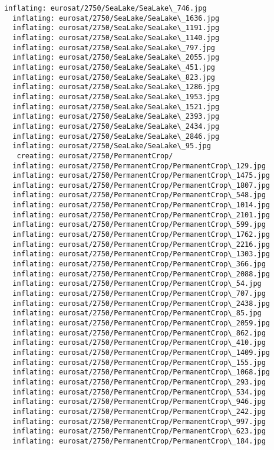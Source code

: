 \documentclass[11pt]{article}
\begin{document}
\begin{Verbatim}[commandchars=\\\{\}]
  inflating: eurosat/2750/SeaLake/SeaLake\_746.jpg
  inflating: eurosat/2750/SeaLake/SeaLake\_1636.jpg
  inflating: eurosat/2750/SeaLake/SeaLake\_1191.jpg
  inflating: eurosat/2750/SeaLake/SeaLake\_1140.jpg
  inflating: eurosat/2750/SeaLake/SeaLake\_797.jpg
  inflating: eurosat/2750/SeaLake/SeaLake\_2055.jpg
  inflating: eurosat/2750/SeaLake/SeaLake\_451.jpg
  inflating: eurosat/2750/SeaLake/SeaLake\_823.jpg
  inflating: eurosat/2750/SeaLake/SeaLake\_1286.jpg
  inflating: eurosat/2750/SeaLake/SeaLake\_1953.jpg
  inflating: eurosat/2750/SeaLake/SeaLake\_1521.jpg
  inflating: eurosat/2750/SeaLake/SeaLake\_2393.jpg
  inflating: eurosat/2750/SeaLake/SeaLake\_2434.jpg
  inflating: eurosat/2750/SeaLake/SeaLake\_2846.jpg
  inflating: eurosat/2750/SeaLake/SeaLake\_95.jpg
   creating: eurosat/2750/PermanentCrop/
  inflating: eurosat/2750/PermanentCrop/PermanentCrop\_129.jpg
  inflating: eurosat/2750/PermanentCrop/PermanentCrop\_1475.jpg
  inflating: eurosat/2750/PermanentCrop/PermanentCrop\_1807.jpg
  inflating: eurosat/2750/PermanentCrop/PermanentCrop\_548.jpg
  inflating: eurosat/2750/PermanentCrop/PermanentCrop\_1014.jpg
  inflating: eurosat/2750/PermanentCrop/PermanentCrop\_2101.jpg
  inflating: eurosat/2750/PermanentCrop/PermanentCrop\_599.jpg
  inflating: eurosat/2750/PermanentCrop/PermanentCrop\_1762.jpg
  inflating: eurosat/2750/PermanentCrop/PermanentCrop\_2216.jpg
  inflating: eurosat/2750/PermanentCrop/PermanentCrop\_1303.jpg
  inflating: eurosat/2750/PermanentCrop/PermanentCrop\_366.jpg
  inflating: eurosat/2750/PermanentCrop/PermanentCrop\_2088.jpg
  inflating: eurosat/2750/PermanentCrop/PermanentCrop\_54.jpg
  inflating: eurosat/2750/PermanentCrop/PermanentCrop\_707.jpg
  inflating: eurosat/2750/PermanentCrop/PermanentCrop\_2438.jpg
  inflating: eurosat/2750/PermanentCrop/PermanentCrop\_85.jpg
  inflating: eurosat/2750/PermanentCrop/PermanentCrop\_2059.jpg
  inflating: eurosat/2750/PermanentCrop/PermanentCrop\_862.jpg
  inflating: eurosat/2750/PermanentCrop/PermanentCrop\_410.jpg
  inflating: eurosat/2750/PermanentCrop/PermanentCrop\_1409.jpg
  inflating: eurosat/2750/PermanentCrop/PermanentCrop\_155.jpg
  inflating: eurosat/2750/PermanentCrop/PermanentCrop\_1068.jpg
  inflating: eurosat/2750/PermanentCrop/PermanentCrop\_293.jpg
  inflating: eurosat/2750/PermanentCrop/PermanentCrop\_534.jpg
  inflating: eurosat/2750/PermanentCrop/PermanentCrop\_946.jpg
  inflating: eurosat/2750/PermanentCrop/PermanentCrop\_242.jpg
  inflating: eurosat/2750/PermanentCrop/PermanentCrop\_997.jpg
  inflating: eurosat/2750/PermanentCrop/PermanentCrop\_623.jpg
  inflating: eurosat/2750/PermanentCrop/PermanentCrop\_184.jpg

\end{Verbatim}
\end{document}
